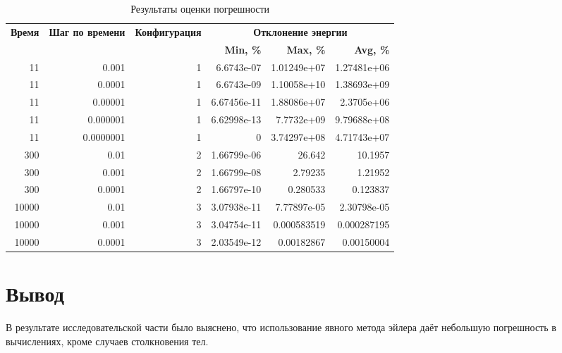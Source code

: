 \begin{longtable}{|r|r|r|r|r|r|}
	\caption{Результаты оценки погрешности} \label{tbl:experiment} 
	\\
	\hline
	\multirow{2}{0.08\textwidth}{\textbf{Время}} & \multirow{2}{0.19\textwidth}{\textbf{Шаг по времени}} &  \multirow{2}{0.17\textwidth}{\textbf{Конфигурация}} & \multicolumn{3}{|c|}{\textbf{Отклонение энергии}} \\
	\cline{4-6} & & &
	 \multicolumn{1}{|p{0.14\textwidth}|}{\textbf{Min, \%}} & \multicolumn{1}{|p{0.14\textwidth}|}{\textbf{Max, \%}} & \multicolumn{1}{|p{0.14\textwidth}|}{\textbf{Avg, \%}} \\
	\hline
	\endfirsthead
\hline
11 & 0.001 & 1 & 6.6743e-07 & 1.01249e+07 & 1.27481e+06 \\ \hline
11 & 0.0001 & 1 & 6.6743e-09 & 1.10058e+10 & 1.38693e+09 \\ \hline
11 & 0.00001 & 1 & 6.67456e-11 & 1.88086e+07 & 2.3705e+06 \\ \hline
11 & 0.000001 & 1 & 6.62998e-13 & 7.7732e+09 & 9.79688e+08 \\ \hline
11 & 0.0000001 & 1 & 0 & 3.74297e+08 & 4.71743e+07 \\ \hline
300 & 0.01 & 2 & 1.66799e-06 & 26.642 & 10.1957 \\ \hline
300 & 0.001 & 2 & 1.66799e-08 & 2.79235 & 1.21952 \\ \hline
300 & 0.0001 & 2 & 1.66797e-10 & 0.280533 & 0.123837 \\ \hline
10000 & 0.01 & 3 & 3.07938e-11 & 7.77897e-05 & 2.30798e-05 \\ \hline
10000 & 0.001 & 3 & 3.04754e-11 & 0.000583519 & 0.000287195 \\ \hline
10000 & 0.0001 & 3 & 2.03549e-12 & 0.00182867 & 0.00150004 \\ \hline

\end{longtable}

\section{Вывод}

В результате исследовательской части было выяснено, что использование явного метода эйлера даёт небольшую погрешность в вычислениях, кроме случаев столкновения тел.


\clearpage

